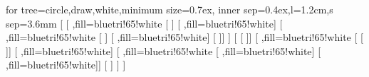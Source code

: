 \begin{center}
	\begin{forest} for tree={circle,draw,white,minimum size=0.7ex,%
		inner sep=0.4ex,l=1.2cm,s sep=3.6mm}
	   [
	      [ ,fill=bluetri!65!white
	         [ ]
	         [ ,fill=bluetri!65!white]
	         [ ,fill=bluetri!65!white
	            [ ] [ ,fill=bluetri!65!white] [ ]]
	      ] [ [ ]]
	      [ ,fill=bluetri!65!white
	         [ [ ]]   [ ,fill=bluetri!65!white]
	         [ ,fill=bluetri!65!white [ ,fill=bluetri!65!white] [ ,fill=bluetri!65!white]]
	         [ ]
	      ]
	   ]
	\end{forest}
\end{center}

